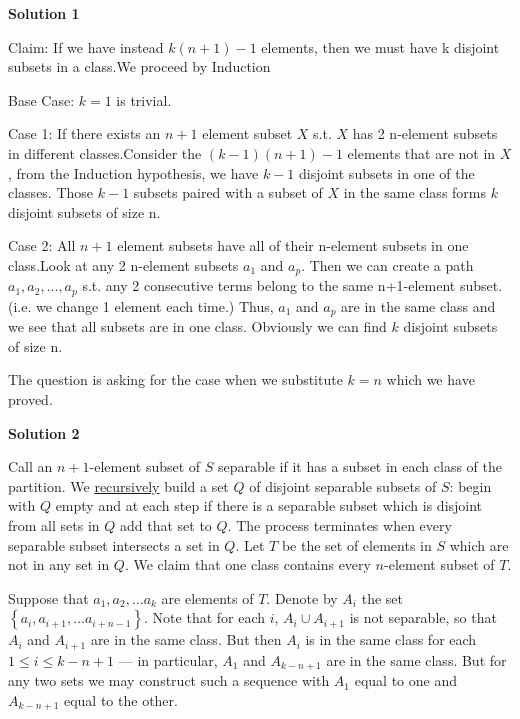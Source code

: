 \begin{enumerate}
 



\textbf{Solution 1}

Claim: If we have instead $k(n+1)-1$ elements, then we must have k disjoint subsets in a class.We proceed by Induction

 Base Case: $k=1$ is trivial.

 Case 1: If there exists an $n+1$ element subset $X$ s.t. $X$ has 2 n-element subsets in different classes.Consider the $(k-1)(n+1)-1$ elements that are not in $X$, from the Induction hypothesis, we have $k-1$ disjoint subsets in one of the classes. Those $k-1$ subsets paired with a subset of $X$ in the same class forms $k$ disjoint subsets of size n.

 Case 2: All $n+1$ element subsets have all of their n-element subsets in one class.Look at any 2 n-element subsets $a_1$ and $a_p$. Then we can create a path $a_1,a_2,...,a_p$ s.t. any 2 consecutive terms belong to the same n+1-element subset.(i.e. we change 1 element each time.) Thus, $a_1$ and $a_p$ are in the same class and we see that all subsets are in one class. Obviously we can find $k$ disjoint subsets of size n.

 
The question is asking for the case when we substitute $k=n$ which we have proved.

 



\textbf{Solution 2}

Call an $n+1$-element subset of $S$ separable if it has a subset in each class of the partition. We \href{https://artofproblemsolving.com/wiki/index.php?title=Recursion}{recursively} build a set $Q$ of disjoint separable subsets of $S$: begin with $Q$ empty and at each step if there is a separable subset which is disjoint from all sets in $Q$ add that set to $Q$. The process terminates when every separable subset intersects a set in $Q$. Let $T$ be the set of elements in $S$ which are not in any set in $Q$. We claim that one class contains every $n$-element subset of $T$.

 Suppose that $a_1, a_2, \ldots a_k$ are elements of $T$. Denote by $A_i$ the set $\left\{a_i, a_{i+1}, \ldots a_{i+n-1}\right\}$. Note that for each $i$, $A_i \cup A_{i+1}$ is not separable, so that $A_i$ and $A_{i+1}$ are in the same class. But then $A_i$ is in the same class for each $1 \leq i \leq k - n + 1$ — in particular, $A_1$ and $A_{k-n+1}$ are in the same class. But for any two sets we may construct such a sequence with $A_1$ equal to one and $A_{k-n+1}$ equal to the other.  


\end{enumerate}
